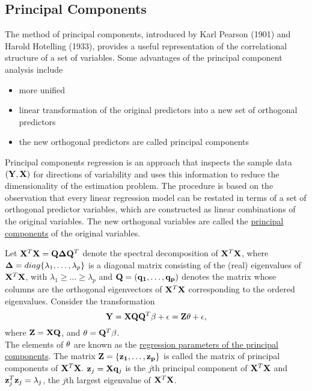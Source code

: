 \subsection*{Principal Components}

The method of principal components, introduced by Karl Pearson (1901) and Harold Hotelling (1933), provides a useful representation of the correlational structure of a set of variables.
Some advantages of the principal component analysis include
\begin{itemize}
	\item more unified
	\item linear transformation of the original predictors into a new set of orthogonal predictors
	\item the new orthogonal predictors are called principal components
\end{itemize}

Principal components regression is an approach that inspects the sample data $(\mathbf{Y}, \mathbf{X})$ for directions of variability and uses this information to reduce the dimensionality of the estimation problem.
The procedure is based on the observation that every linear regression model can be restated in terms of a set of orthogonal predictor variables, which are constructed as linear combinations of the original variables.
The new orthogonal variables are called the \underline{principal components} of the original variables.

Let $\mathbf{X} ^T \mathbf{X} = \mathbf{Q} \mathbf{\Delta} \mathbf{Q}^T $ denote the spectral decomposition of $\mathbf{X} ^T \mathbf{X}$, where $\mathbf{\Delta} = diag\{\lambda_1, \dots, \lambda_p\}$ is a diagonal matrix consisting of the (real) eigenvalues of $\mathbf{X} ^T \mathbf{X}$,
with $\lambda_1 \ge \dots \ge \lambda_p$ and $\mathbf{Q} = (\mathbf{q_1}, \dots, \mathbf{q_p})$ denotes the matrix whose columns are the orthogonal eigenvectors of $\mathbf{X} ^T \mathbf{X}$ corresponding to the ordered eigenvalues.
Consider the transformation
$$
\mathbf{Y} = \mathbf{X}\mathbf{Q}\mathbf{Q}^T \mathbf{\beta} + \mathbf{\epsilon} = \mathbf{Z}\mathbf{\theta} + \mathbf{\epsilon},
$$
where $\mathbf{Z} = \mathbf{XQ}$, and $\mathbf{\theta} = \mathbf{Q}^T \mathbf{\beta}$.\\
The elements of $\mathbf{\theta}$ are known as the \underline{regression parameters of the principal components}.
The matrix $\mathbf{Z} = \{\mathbf{z_1}, \dots, \mathbf{z_p}\}$ is called the matrix of principal components of $\mathbf{X} ^T \mathbf{X}$.
$\mathbf{z}_j = \mathbf{X}\mathbf{q}_j$ is the $j$th principal component of $\mathbf{X} ^T \mathbf{X}$ and $\mathbf{z}_j^T \mathbf{z}_j = \lambda_j$, the $j$th largest eigenvalue of $\mathbf{X} ^T \mathbf{X}$.

